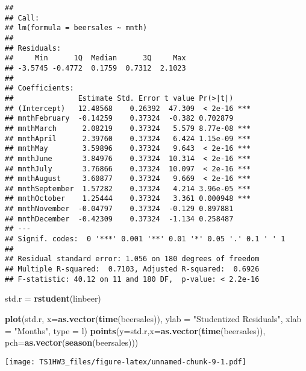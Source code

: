 \documentclass[
]{article}
\newenvironment{Shaded}{\begin{snugshade}}{\end{snugshade}}
\newcommand{\AttributeTok}[1]{\textcolor[rgb]{0.13,0.29,0.53}{#1}}
\newcommand{\FunctionTok}[1]{\textcolor[rgb]{0.13,0.29,0.53}{\textbf{#1}}}
\newcommand{\NormalTok}[1]{#1}
\newcommand{\OtherTok}[1]{\textcolor[rgb]{0.56,0.35,0.01}{#1}}
\newcommand{\StringTok}[1]{\textcolor[rgb]{0.31,0.60,0.02}{#1}}
\begin{document}
\begin{verbatim}
## 
## Call:
## lm(formula = beersales ~ mnth)
## 
## Residuals:
##     Min      1Q  Median      3Q     Max 
## -3.5745 -0.4772  0.1759  0.7312  2.1023 
## 
## Coefficients:
##               Estimate Std. Error t value Pr(>|t|)    
## (Intercept)   12.48568    0.26392  47.309  < 2e-16 ***
## mnthFebruary  -0.14259    0.37324  -0.382 0.702879    
## mnthMarch      2.08219    0.37324   5.579 8.77e-08 ***
## mnthApril      2.39760    0.37324   6.424 1.15e-09 ***
## mnthMay        3.59896    0.37324   9.643  < 2e-16 ***
## mnthJune       3.84976    0.37324  10.314  < 2e-16 ***
## mnthJuly       3.76866    0.37324  10.097  < 2e-16 ***
## mnthAugust     3.60877    0.37324   9.669  < 2e-16 ***
## mnthSeptember  1.57282    0.37324   4.214 3.96e-05 ***
## mnthOctober    1.25444    0.37324   3.361 0.000948 ***
## mnthNovember  -0.04797    0.37324  -0.129 0.897881    
## mnthDecember  -0.42309    0.37324  -1.134 0.258487    
## ---
## Signif. codes:  0 '***' 0.001 '**' 0.01 '*' 0.05 '.' 0.1 ' ' 1
## 
## Residual standard error: 1.056 on 180 degrees of freedom
## Multiple R-squared:  0.7103, Adjusted R-squared:  0.6926 
## F-statistic: 40.12 on 11 and 180 DF,  p-value: < 2.2e-16
\end{verbatim}

\begin{Shaded}
\begin{Highlighting}[]
\NormalTok{std.r }\OtherTok{=} \FunctionTok{rstudent}\NormalTok{(linbeer)}
\end{Highlighting}
\end{Shaded}

\begin{Shaded}
\begin{Highlighting}[]
\FunctionTok{plot}\NormalTok{(std.r, }\AttributeTok{x=}\FunctionTok{as.vector}\NormalTok{(}\FunctionTok{time}\NormalTok{(beersales)), }\AttributeTok{ylab =} \StringTok{"Studentized Residuals"}\NormalTok{, }\AttributeTok{xlab =} \StringTok{"Months"}\NormalTok{, }\AttributeTok{type =} \StringTok{\textquotesingle{}l\textquotesingle{}}\NormalTok{)}
\FunctionTok{points}\NormalTok{(}\AttributeTok{y=}\NormalTok{std.r,}\AttributeTok{x=}\FunctionTok{as.vector}\NormalTok{(}\FunctionTok{time}\NormalTok{(beersales)), }\AttributeTok{pch=}\FunctionTok{as.vector}\NormalTok{(}\FunctionTok{season}\NormalTok{(beersales)))}
\end{Highlighting}
\end{Shaded}

\texttt{[image: TS1HW3\_files/figure-latex/unnamed-chunk-9-1.pdf]}
\end{document}
